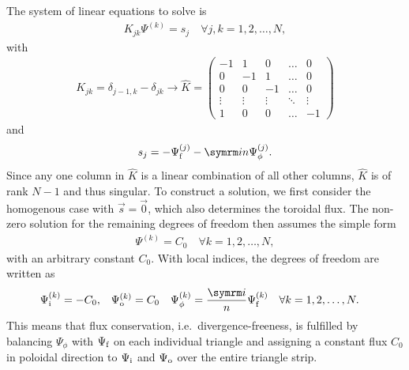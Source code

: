 The system of linear equations to solve is
\begin{gather}
  K_{jk} \Psi^{(k)} = s_{j} \quad \forall j, k = 1, 2, \dotsc, N,
\end{gather}
with
\begin{gather}
  K_{jk} = \delta_{j-1, k} - \delta_{jk} \rightarrow \hat{K} = \begin{pmatrix}
    -1   &    1   &    0   & \hdots &    0   \\
     0   &   -1   &    1   & \hdots &    0   \\
     0   &    0   &   -1   & \hdots &    0   \\
  \vdots & \vdots & \vdots & \ddots & \vdots \\
     1   &    0   &    0   & \hdots &   -1
  \end{pmatrix}
\end{gather}
and
\begin{gather}
  s_{j} = -\Psi_{\fs}^{(j)} - \im n \Psi_{\phi}^{(j)}.
\end{gather}
Since any one column in $\hat{K}$ is a linear combination of all other columns, $\hat{K}$ is of rank $N - 1$ and thus singular. To construct a solution, we first consider the homogenous case with $\vec{s} = \vec{0}$, which also determines the toroidal flux. The non-zero solution for the remaining degrees of freedom then assumes the simple form
\begin{gather}
  \Psi^{(k)} = C_{0} \quad \forall k = 1, 2, \dotsc, N,
\end{gather}
with an arbitrary constant $C_{0}$. With local indices, the degrees of freedom are written as 
\begin{align}
  \Psi_{\inw}^{(k)} &= -C_{0}, & \Psi_{\out}^{(k)} &= C_{0} & \Psi_{\phi}^{(k)} &= \frac{\im}{n} \Psi_{\fs}^{(k)} \quad \forall k = 1, 2, \dotsc, N. \label{eq:Psi_hom}
\end{align}
This means that flux conservation, i.e.\ divergence-freeness, is fulfilled by balancing $\Psi_{\phi}$ with $\Psi_{\textrm{f}}$ on each individual triangle and assigning a constant flux $C_{0}$ in poloidal direction to $\Psi_{\textrm{i}}$ and $\Psi_{\textrm{o}}$ over the entire triangle strip.

